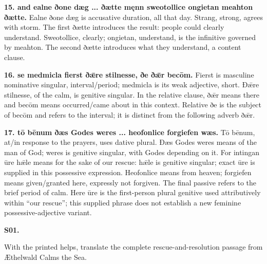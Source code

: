 \textbf{15. and ealne ðone dæg ... ðætte męnn sweotollice ongietan meahton ðætte.} Ealne ðone dæg is accusative duration, all that day. Strang, strong, agrees with storm. The first ðætte introduces the result: people could clearly understand. Sweotollice, clearly; ongietan, understand, is the infinitive governed by meahton. The second ðætte introduces what they understand, a content clause.

\textbf{16. se medmicla fierst ðǣre stilnesse, ðe ðǣr becōm.} Fierst is masculine nominative singular, interval/\allowbreak{}period; medmicla is its weak adjective, short. Ðǣre stilnesse, of the calm, is genitive singular. In the relative clause, ðǣr means there and becōm means occurred/\allowbreak{}came about in this context. Relative ðe is the subject of becōm and refers to the interval; it is distinct from the following adverb ðǣr.

\textbf{17. tō bēnum ðæs Godes weres ... heofonlice forgiefen wæs.} Tō bēnum, at/\allowbreak{}in response to the prayers, uses dative plural. Ðæs Godes weres means of the man of God; weres is genitive singular, with Godes depending on it. For intingan ūre hǣle means for the sake of our rescue: hǣle is genitive singular; exact ūre is supplied in this possessive expression. Heofonlice means from heaven; forgiefen means given/\allowbreak{}granted here, expressly not forgiven. The final passive refers to the brief period of calm. Here ūre is the first-person plural genitive used attributively within “our rescue”; this supplied phrase does not establish a new feminine possessive-adjective variant.

\par\begin{minipage}{\linewidth}\raggedright
\textbf{S01.}

With the printed helps, translate the complete rescue-and-resolution passage from Æthelwald Calms the Sea.

\end{minipage}\par\addvspace{4pt}

